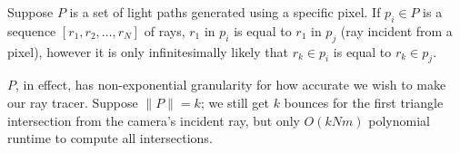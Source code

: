 \documentclass[../main.tex]{subfiles}
\begin{document}
Suppose \(P\) is a set of light paths generated using a specific pixel.
If \(p_i \in P\) is a sequence \([r_1, r_2, \hdots, r_N]\) of rays,
\(r_1\) in \(p_i\) is equal to \(r_1\) in \(p_j\) (ray incident from a pixel),
however it is only infinitesimally likely that \(r_k \in p_i\) is equal to \(r_k \in p_j\).

\(P\), in effect, has non-exponential granularity for how accurate we wish to make
our ray tracer. Suppose \(\|P\|=k\); we still get \(k\) bounces for the first triangle
intersection from the camera's incident ray, but only \(O(kNm)\) polynomial runtime to
compute all intersections.


\ifSubfilesClassLoaded{%
    \nocite{*}
    \twocolumn
}{}
\end{document}
